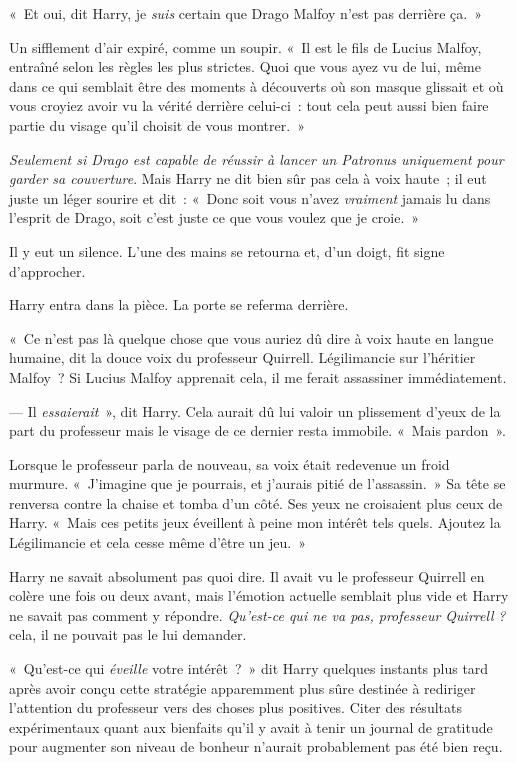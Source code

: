 «~Et oui, dit Harry, je \emph{suis} certain que Drago Malfoy n'est pas derrière ça.~»

Un sifflement d'air expiré, comme un soupir. «~Il est le fils de Lucius Malfoy, entraîné selon les règles les plus strictes. Quoi que vous ayez vu de lui, même dans ce qui semblait être des moments à découverts où son masque glissait et où vous croyiez avoir vu la vérité derrière celui-ci~: tout cela peut aussi bien faire partie du visage qu'il choisit de vous montrer.~»

\emph{Seulement si Drago est capable de réussir à lancer un Patronus uniquement pour garder sa couverture}. Mais Harry ne dit bien sûr pas cela à voix haute~; il eut juste un léger sourire et dit~: «~Donc soit vous n'avez \emph{vraiment} jamais lu dans l'esprit de Drago, soit c'est juste ce que vous voulez que je croie.~»

Il y eut un silence. L'une des mains se retourna et, d'un doigt, fit signe d'approcher.

Harry entra dans la pièce. La porte se referma derrière.

«~Ce n'est pas là quelque chose que vous auriez dû dire à voix haute en langue humaine, dit la douce voix du professeur Quirrell. Légilimancie sur l'héritier Malfoy~? Si Lucius Malfoy apprenait cela, il me ferait assassiner immédiatement.

--- Il \emph{essaierait}~», dit Harry. Cela aurait dû lui valoir un plissement d'yeux de la part du professeur mais le visage de ce dernier resta immobile. «~Mais pardon~».

Lorsque le professeur parla de nouveau, sa voix était redevenue un froid murmure. «~J'imagine que je pourrais, et j'aurais pitié de l'assassin.~» Sa tête se renversa contre la chaise et tomba d'un côté. Ses yeux ne croisaient plus ceux de Harry. «~Mais ces petits jeux éveillent à peine mon intérêt tels quels. Ajoutez la Légilimancie et cela cesse même d'être un jeu.~»

Harry ne savait absolument pas quoi dire. Il avait vu le professeur Quirrell en colère une fois ou deux avant, mais l'émotion actuelle semblait plus vide et Harry ne savait pas comment y répondre. \emph{Qu'est-ce qui ne va pas, professeur Quirrell} \emph{?} cela, il ne pouvait pas le lui demander.

«~Qu'est-ce qui \emph{éveille} votre intérêt~?~» dit Harry quelques instants plus tard après avoir conçu cette stratégie apparemment plus sûre destinée à rediriger l'attention du professeur vers des choses plus positives. Citer des résultats expérimentaux quant aux bienfaits qu'il y avait à tenir un journal de gratitude pour augmenter son niveau de bonheur n'aurait probablement pas été bien reçu.


